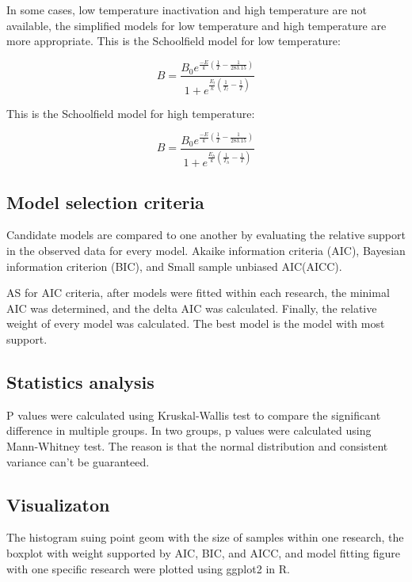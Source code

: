 \documentclass[11pt]{article}
\begin{document}
In some cases, low temperature inactivation and high temperature are not available, the simplified models for low temperature and high temperature are more appropriate. 
This is the Schoolfield model for low temperature:

\begin{equation}
B = \frac{B_0 e^{\frac{-E}{k}(\frac{1}{T} - \frac{1}{283.15})}} {1 + e^{\frac{E_l} {k} (\frac{1}{T_l} - \frac{1}{T})} }
\end{equation}

This is the Schoolfield model for high temperature:

\begin{equation}
B = \frac{B_0 e^{\frac{-E}{k}(\frac{1}{T} - \frac{1}{283.15})}} {1 +  e^{\frac{E_h}{k} (\frac{1}{T_h} - \frac{1}{T})}}
\end{equation}
\subsection{Model selection criteria}
Candidate models are compared to one another by evaluating the relative support in the observed data for every model\citep{johnson2004model}. Akaike information criteria (AIC)\citep{burnham2004multimodel}, Bayesian information criterion (BIC)\citep{schwarz1978estimating}, and Small sample unbiased AIC(AICC)\citep{burnham2004multimodel}.

AS for AIC criteria, after models were fitted within each research, the minimal AIC was determined, and the delta AIC was calculated. Finally, the relative weight of every model was calculated. The best model is the model with most support\citep{burnham2004multimodel}.

\subsection{Statistics analysis}
P values were calculated using Kruskal-Wallis test\citep{vargha1998kruskal} to compare the significant difference in multiple groups. In two groups, p values were calculated using Mann-Whitney test\citep{ruxton2006unequal}. The reason is that the normal distribution and consistent variance can't be guaranteed.
\subsection{Visualizaton}
The histogram suing point geom with the size of samples within one research, the boxplot with weight supported by AIC, BIC, and AICC, and model fitting figure with one specific research were plotted using ggplot2 \citep{wickham2016ggplot2} in R.
\end{document}
